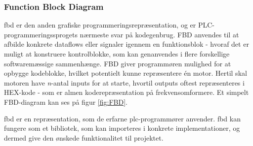 


\subsubsection{Function Block Diagram}
\gls{fbd} er den anden grafiske programmeringsrepræsentation, og er PLC-programmeringssprogets nærmeste svar på kodegenbrug. FBD anvendes til at afbilde konkrete dataflows eller signaler igennem en funktionsblok - hvoraf det er muligt at konstruere kontrolblokke, som kan genanvendes i flere forskellige softwaremæssige sammenhænge. FBD giver programmøren mulighed for at opbygge kodeblokke, hvilket potentielt kunne repræsentere én motor. Hertil skal motoren have \textit{n}-antal inputs for at starte, hvortil outputs oftest repræsenteres i HEX-kode - som er almen koderepræsentation på frekvensomformere. Et simpelt FBD-diagram kan ses på figur \ref{fig:FBD}.


\noindent \gls{fbd} er en repræsentation, som de erfarne \gls{plc}-programmører anvender. \gls{fbd} kan fungere som et bibliotek, som kan importeres i konkrete implementationer, og dermed give den ønskede funktionalitet til projektet. \cite{FDB_desc}

